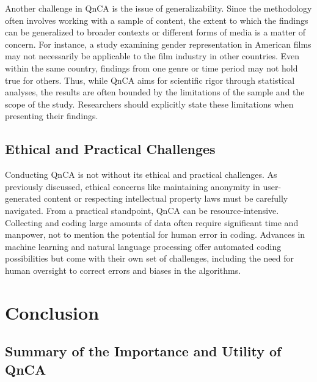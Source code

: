 \documentclass[
  b5paper]{book}
\begin{document}
Another challenge in QnCA is the issue of generalizability. Since the methodology often involves working with a sample of content, the extent to which the findings can be generalized to broader contexts or different forms of media is a matter of concern. For instance, a study examining gender representation in American films may not necessarily be applicable to the film industry in other countries. Even within the same country, findings from one genre or time period may not hold true for others. Thus, while QnCA aims for scientific rigor through statistical analyses, the results are often bounded by the limitations of the sample and the scope of the study. Researchers should explicitly state these limitations when presenting their findings.

\hypertarget{ethical-and-practical-challenges}{%
\subsection*{Ethical and Practical Challenges}\label{ethical-and-practical-challenges}}

Conducting QnCA is not without its ethical and practical challenges. As previously discussed, ethical concerns like maintaining anonymity in user-generated content or respecting intellectual property laws must be carefully navigated. From a practical standpoint, QnCA can be resource-intensive. Collecting and coding large amounts of data often require significant time and manpower, not to mention the potential for human error in coding. Advances in machine learning and natural language processing offer automated coding possibilities but come with their own set of challenges, including the need for human oversight to correct errors and biases in the algorithms.

\hypertarget{conclusion-3}{%
\section{Conclusion}\label{conclusion-3}}

\hypertarget{summary-of-the-importance-and-utility-of-qnca}{%
\subsection*{Summary of the Importance and Utility of QnCA}\label{summary-of-the-importance-and-utility-of-qnca}}
\end{document}
